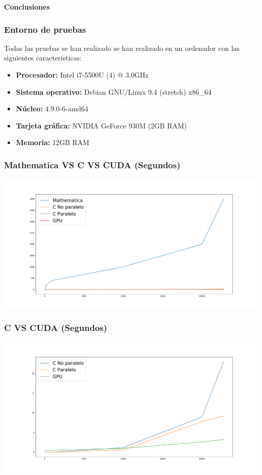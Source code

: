 \documentclass[aspectratio=169]{beamer}
\begin{document}
\begin{frame}
	\centering \LARGE \bfseries \color{naranjaUCA} Conclusiones
\end{frame}

\begin{frame}
	\frametitle{Entorno de pruebas}
	Todas las pruebas se han realizado se han realizado en un ordenador con las siguientes características:
	\pause
	\begin{itemize}
		\item \textbf{Procesador: } Intel i7-5500U (4) @ 3.0GHz 
		\item \textbf{Sistema operativo: } Debian GNU/Linux 9.4 (stretch) x86\_64 
		\item \textbf{Núcleo: } 4.9.0-6-amd64 
		\item \textbf{Tarjeta gráfica: } NVIDIA GeForce 930M (2GB RAM)
		\item \textbf{Memoria: } 12GB RAM
		
	\end{itemize}
\end{frame}

\begin{frame}
	\frametitle{Mathematica VS C VS CUDA (Segundos)}
	\includegraphics[width=\textwidth]{calor_mathematica_vs_buenos.pdf}
\end{frame}

\begin{frame}
	\frametitle{C VS CUDA (Segundos)}
	\includegraphics[width=\textwidth]{c_cuda.pdf}
\end{frame}
\end{document}
